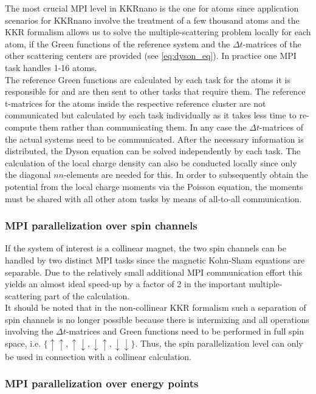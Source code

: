 \documentclass [a4paper, 12pt]{article}
\begin{document}
The most crucial MPI level in KKRnano is the one for atoms since application scenarios for KKRnano
involve the treatment of a few thousand atoms and the KKR formalism allows us to solve the
multiple-scattering problem locally for each atom, if the Green functions of the reference system and
the $\Delta t$-matrices of the other scattering centers are provided (see \cref{eq:dyson_eq}).
In practice one MPI task handles 1-16 atoms.
\\
The reference Green functions are calculated by each task
for the atoms it is responsible for and are then sent to other tasks that require them. 
The reference t-matrices for the atoms inside the respective reference cluster are not communicated 
but calculated by each task individually as it takes less time to re-compute them rather than communicating them.
In any case the $\Delta t$-matrices of the actual systems need to be communicated.
After the necessary information is distributed, the Dyson equation can be solved independently by each task.
The calculation of the local charge density can also be conducted locally since only the diagonal
$nn$-elements are needed for this.
In order to subsequently obtain the potential from the local charge moments via the Poisson equation,
the moments must be shared with all other atom tasks by means of all-to-all communication.

\subsubsection*{MPI parallelization over spin channels}

If the system of interest is a collinear magnet, the two spin channels can be handled by two distinct
MPI tasks since the
magnetic Kohn-Sham equations are separable.
Due to the relatively small additional MPI communication effort
this yields an almost ideal speed-up by a factor of 2 in the important
multiple-scattering part of the calculation.
\\
It should be noted that in the non-collinear KKR formalism such a 
separation of spin channels is no longer possible because 
there is intermixing and all operations involving the
$\Delta t$-matrices and Green functions
need to be performed in full spin space, i.e. $\{\uparrow \uparrow, \uparrow \downarrow,
\downarrow \uparrow, \downarrow \downarrow \}$.
Thus, the spin parallelization level can only be used in connection with
a collinear calculation.


\subsubsection*{MPI parallelization over energy points}
\end{document}
